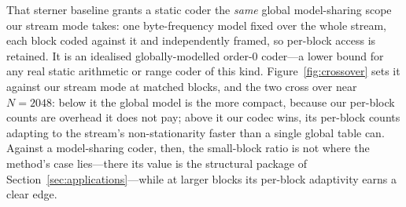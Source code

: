 \documentclass[entropy,article,submit,oneauthor,pdftex]{Definitions/mdpi}
\begin{document}
That sterner baseline grants a static coder the \emph{same} global model-sharing scope our
stream mode takes: one byte-frequency model fixed over the whole stream, each block coded
against it and independently framed, so per-block access is retained. It is an idealised
globally-modelled order-$0$ coder---a lower bound for any real static arithmetic or range
coder of this kind. Figure~\ref{fig:crossover} sets
it against our stream mode at matched blocks, and the two cross over near $N{=}2048$: below it the global model is the more
compact, because our per-block counts are overhead it does not pay; above it our codec
wins, its per-block counts adapting to the stream's non-stationarity faster than a single
global table can. Against a model-sharing coder, then, the small-block ratio is not where the
method's case lies---there its value is the structural package of
Section~\ref{sec:applications}---while at larger blocks its per-block adaptivity earns a
clear edge.
\end{document}
